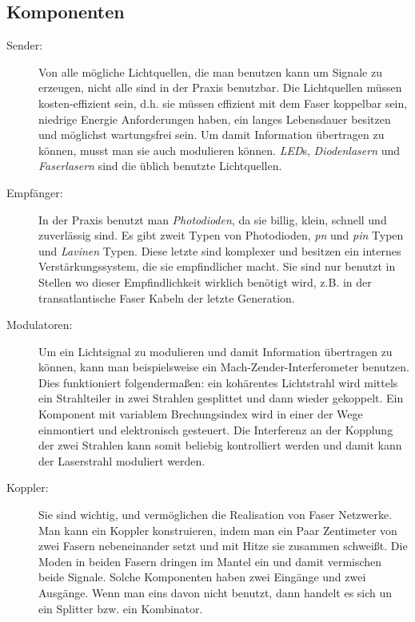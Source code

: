 \documentclass[a4paper]{article}
\begin{document}
\subsection{Komponenten}
\begin{description}
  \item[Sender:]
    Von alle mögliche Lichtquellen, die man benutzen kann um Signale zu
    erzeugen, nicht alle sind in der Praxis benutzbar. Die Lichtquellen müssen
    kosten-effizient sein, d.h. sie müssen effizient mit dem Faser koppelbar
    sein, niedrige Energie Anforderungen haben, ein langes Lebensdauer besitzen
    und möglichst wartungsfrei sein. Um damit Information übertragen zu können,
    musst man sie auch modulieren können. \emph{LED}s, \emph{Diodenlasern} und
    \emph{Faserlasern} sind die üblich benutzte Lichtquellen.

  \item[Empfänger:]
    In der Praxis benutzt man \emph{Photodioden}, da sie billig, klein, schnell
    und zuverlässig sind. Es gibt zweit Typen von Photodioden, \emph{pn} und
    \emph{pin} Typen und \emph{Lavinen} Typen. Diese letzte sind komplexer und
    besitzen ein internes Verstärkungssystem, die sie empfindlicher macht. Sie
    sind nur benutzt in Stellen wo dieser Empfindlichkeit wirklich benötigt
    wird, z.B. in der transatlantische Faser Kabeln der letzte Generation. 

  \item[Modulatoren:]
    Um ein Lichtsignal zu modulieren und damit Information übertragen zu
    können, kann man beispielsweise ein Mach-Zender-Interferometer benutzen.
    Dies funktioniert folgendermaßen: ein kohärentes Lichtstrahl wird mittels
    ein Strahlteiler in zwei Strahlen gesplittet und dann wieder gekoppelt. Ein
    Komponent mit variablem Brechungsindex wird in einer der Wege einmontiert
    und elektronisch gesteuert. Die Interferenz an der Kopplung der zwei
    Strahlen kann somit beliebig kontrolliert werden und damit kann der
    Laserstrahl moduliert werden.

  \item[Koppler:]
    Sie sind wichtig, und vermöglichen die Realisation von Faser Netzwerke. Man
    kann ein Koppler konstruieren, indem man ein Paar Zentimeter von zwei
    Fasern nebeneinander setzt und mit Hitze sie zusammen schweißt. Die Moden
    in beiden Fasern dringen im Mantel ein und damit vermischen beide Signale.
    Solche Komponenten haben zwei Eingänge und zwei Ausgänge. Wenn man eins
    davon nicht benutzt, dann handelt es sich un ein Splitter bzw. ein
    Kombinator.


\end{description}
\end{document}
